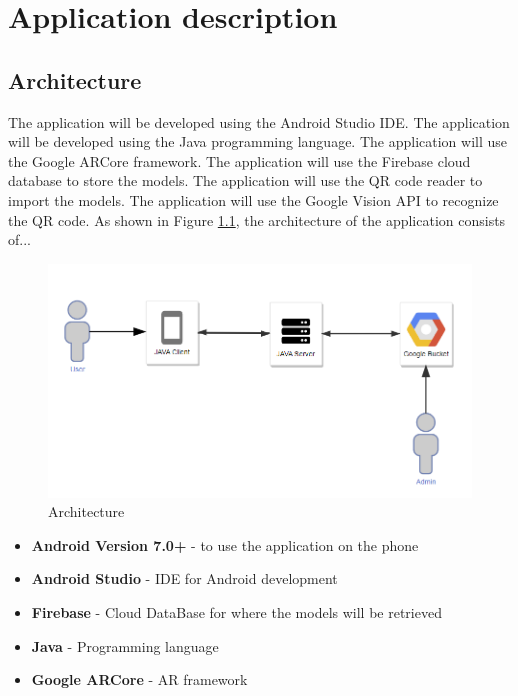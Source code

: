 \chapter{Application description}\label{chapter:appdescription}

\section{Architecture}
The application will be developed using the Android Studio IDE.
The application will be developed using the Java programming language.
The application will use the Google ARCore framework\cite{ARCore}.
The application will use the Firebase cloud database to store the models. The application will use the QR code reader to import the models.
The application will use the Google Vision API to recognize the QR code.
As shown in Figure \ref{fig:architecture}, the architecture of the application consists of...

\begin{figure}[ht]
    \centering
    \includegraphics[width=1\textwidth]{img/architecture.png}
    \caption{Architecture}
    \label{fig:architecture}
\end{figure}

\begin{itemize}
    \item \textbf{Android Version 7.0+} - to use the application on the phone
    \item \textbf{Android Studio} - IDE for Android development
    \item \textbf{Firebase} - Cloud DataBase for where the models will be retrieved
    \item \textbf{Java} - Programming language
    \item \textbf{Google ARCore} - AR framework
\end{itemize}

